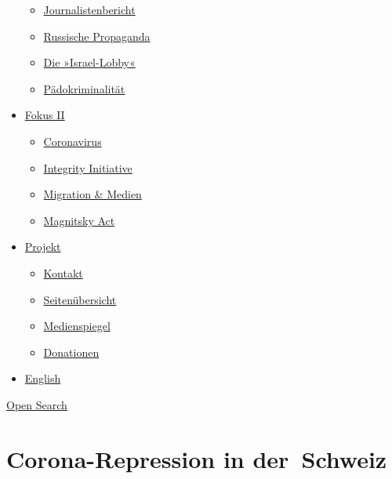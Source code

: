 \begin{itemize}
  \begin{itemize}
  \tightlist
  \item
    \href{https://swprs.org/bericht-eines-journalisten/}{Journalistenbericht}
  \item
    \href{https://swprs.org/russische-propaganda/}{Russische Propaganda}
  \item
    \href{https://swprs.org/die-israel-lobby-fakten-und-mythen/}{Die
    »Israel-Lobby«}
  \item
    \href{https://swprs.org/geopolitik-und-paedokriminalitaet/}{Pädokriminalität}
  \end{itemize}
\item
  \href{https://swprs.org/migration-und-medien/}{Fokus II}

  \begin{itemize}
  \tightlist
  \item
    \href{https://swprs.org/covid-19-hinweis-ii/}{Coronavirus}
  \item
    \href{https://swprs.org/die-integrity-initiative/}{Integrity
    Initiative}
  \item
    \href{https://swprs.org/migration-und-medien/}{Migration \& Medien}
  \item
    \href{https://swprs.org/der-fall-magnitsky/}{Magnitsky Act}
  \end{itemize}
\item
  \href{https://swprs.org/kontakt/}{Projekt}

  \begin{itemize}
  \tightlist
  \item
    \href{https://swprs.org/kontakt/}{Kontakt}
  \item
    \href{https://swprs.org/uebersicht/}{Seitenübersicht}
  \item
    \href{https://swprs.org/medienspiegel/}{Medienspiegel}
  \item
    \href{https://swprs.org/donationen/}{Donationen}
  \end{itemize}
\item
  \href{https://swprs.org/contact/}{English}
\end{itemize}

\protect\hyperlink{}{Open Search}

\hypertarget{corona-repression-in-der-schweiz}{%
\section{Corona-Repression in
der~Schweiz}\label{corona-repression-in-der-schweiz}}

